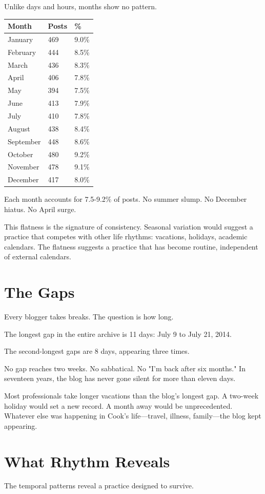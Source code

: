 Unlike days and hours, months show no pattern.

\begin{longtable}{p{3.00cm}p{3.00cm}p{3.00cm}}
\toprule
\textbf{Month} & \textbf{Posts} & \textbf{\%} \tabularnewline
\midrule
January & 469 & 9.0\% \tabularnewline
February & 444 & 8.5\% \tabularnewline
March & 436 & 8.3\% \tabularnewline
April & 406 & 7.8\% \tabularnewline
May & 394 & 7.5\% \tabularnewline
June & 413 & 7.9\% \tabularnewline
July & 410 & 7.8\% \tabularnewline
August & 438 & 8.4\% \tabularnewline
September & 448 & 8.6\% \tabularnewline
October & 480 & 9.2\% \tabularnewline
November & 478 & 9.1\% \tabularnewline
December & 417 & 8.0\% \tabularnewline
\bottomrule
\end{longtable}

Each month accounts for 7.5-9.2\% of posts. No summer slump. No December hiatus. No April surge.

This flatness is the signature of consistency. Seasonal variation would suggest a practice that competes with other life rhythms: vacations, holidays, academic calendars. The flatness suggests a practice that has become routine, independent of external calendars.

\bigskip

\section*{The Gaps}

Every blogger takes breaks. The question is how long.

The longest gap in the entire archive is 11 days: July 9 to July 21, 2014.

The second-longest gaps are 8 days, appearing three times.

No gap reaches two weeks. No sabbatical. No "I'm back after six months." In seventeen years, the blog has never gone silent for more than eleven days.

Most professionals take longer vacations than the blog's longest gap. A two-week holiday would set a new record. A month away would be unprecedented. Whatever else was happening in Cook's life---travel, illness, family---the blog kept appearing.

\bigskip

\section*{What Rhythm Reveals}

The temporal patterns reveal a practice designed to survive.

